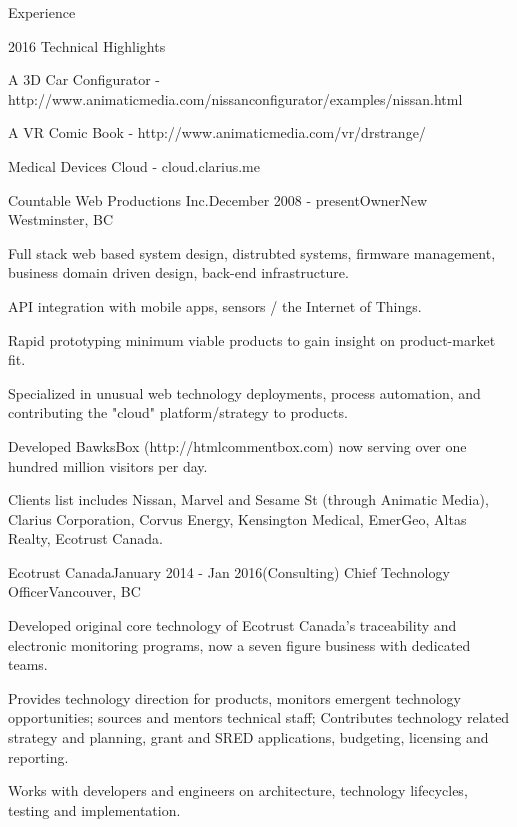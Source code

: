 \documentclass{resume} %
\begin{document}

\begin{rSection}{Experience}

\begin{rSubsection}{2016 Technical Highlights}{}{}{}
\item A 3D Car Configurator - http://www.animaticmedia.com/nissanconfigurator/examples/nissan.html
\item A VR Comic Book - http://www.animaticmedia.com/vr/drstrange/
\item Medical Devices Cloud - cloud.clarius.me
\end{rSubsection}


\begin{rSubsection}{Countable Web Productions Inc.}{December 2008 - present}{Owner}{New Westminster, BC}
\item Full stack web based system design, distrubted systems, firmware management, business domain driven design, back-end infrastructure.
\item API integration with mobile apps, sensors / the Internet of Things.
\item Rapid prototyping minimum viable products to gain insight on product-market fit.
\item Specialized in unusual web technology deployments, process automation, and contributing the "cloud" platform/strategy to products.
\item Developed BawksBox (http://htmlcommentbox.com) now serving over one hundred million visitors per day.
\item Clients list includes Nissan, Marvel and Sesame St (through Animatic Media), Clarius Corporation, Corvus Energy, Kensington Medical, EmerGeo, Altas Realty, Ecotrust Canada.
\end{rSubsection}


\begin{rSubsection}{Ecotrust Canada}{January 2014 - Jan 2016}{(Consulting) Chief Technology Officer}{Vancouver, BC}
\item Developed original core technology of Ecotrust Canada's traceability and electronic monitoring programs, now a seven figure business with dedicated teams.
\item Provides technology direction for products, monitors emergent technology opportunities; sources and mentors technical staff; Contributes technology related strategy and planning, grant and SRED applications, budgeting, licensing and reporting.
\item Works with developers and engineers on architecture, technology lifecycles, testing and implementation.
\end{rSubsection}


\end{rSection}
\end{document}
